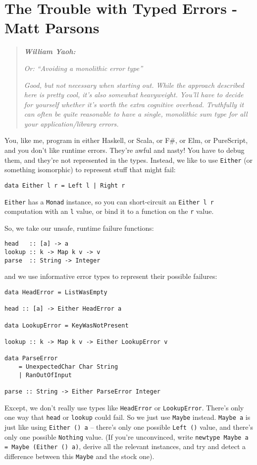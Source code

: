 \chapter{The Trouble with Typed Errors - Matt Parsons}

\begin{quotation}
\noindent\textit{\textbf{William Yaoh:}}

\textit{Or: ``Avoiding a monolithic error type''}

\textit{Good, but not necessary when starting out. While the approach described here is pretty cool, it's also somewhat heavyweight. You'll have to decide for yourself whether it's worth the extra cognitive overhead. Truthfully it can often be quite reasonable to have a single, monolithic sum type for all your application/library errors.}
\end{quotation}

You, like me, program in either Haskell, or Scala, or F\#, or Elm, or PureScript, and you don't like runtime errors. They're awful and nasty! You have to debug them, and they're not represented in the types. Instead, we like to use \texttt{Either} (or something isomorphic) to represent stuff that might fail:

\begin{verbatim}
data Either l r = Left l | Right r
\end{verbatim}
\texttt{Either} has a \texttt{Monad} instance, so you can short-circuit an \texttt{Either l r} computation with an \texttt{l} value, or bind it to a function on the \texttt{r} value.

So, we take our unsafe, runtime failure functions:

\begin{verbatim}
head   :: [a] -> a
lookup :: k -> Map k v -> v
parse  :: String -> Integer
\end{verbatim}
and we use informative error types to represent their possible failures:

\begin{verbatim}
data HeadError = ListWasEmpty

head :: [a] -> Either HeadError a

data LookupError = KeyWasNotPresent

lookup :: k -> Map k v -> Either LookupError v

data ParseError
    = UnexpectedChar Char String
    | RanOutOfInput

parse :: String -> Either ParseError Integer
\end{verbatim}
Except, we don't really use types like \texttt{HeadError} or \texttt{LookupError}. There's only one way that \texttt{head} or \texttt{lookup} could fail. So we just use \texttt{Maybe} instead. \texttt{Maybe a} is just like using \texttt{Either () a} -- there's only one possible \texttt{Left ()} value, and there's only one possible \texttt{Nothing} value. (If you're unconvinced, write \texttt{newtype Maybe a = Maybe (Either () a)}, derive all the relevant instances, and try and detect a difference between this \texttt{Maybe} and the stock one).

